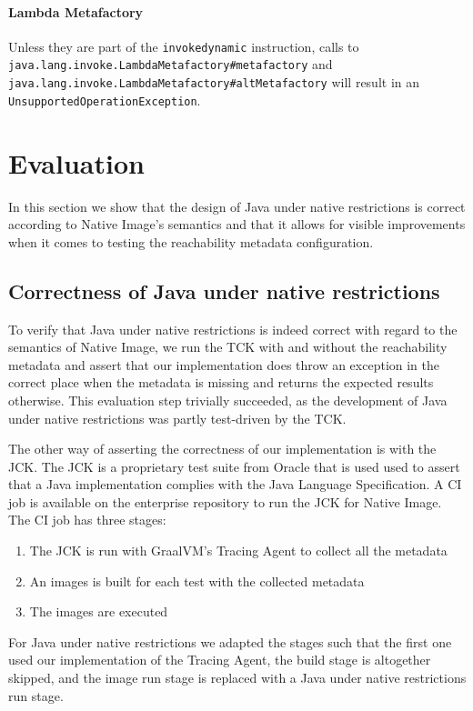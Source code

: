 \subsubsection{Lambda Metafactory}

Unless they are part of the \texttt{invokedynamic} instruction, calls to \texttt{java.lang.invoke.LambdaMetafactory\#metafactory} and \texttt{java.lang.invoke.LambdaMetafactory\#altMetafactory} will result in an \texttt{UnsupportedOperationException}.


\chapter{Evaluation}
In this section we show that the design of Java under native restrictions is correct according to Native Image's semantics and that it allows for visible improvements when it comes to testing the reachability metadata configuration.

\section{Correctness of Java under native restrictions}
To verify that Java under native restrictions is indeed correct with regard to the semantics of Native Image, we run the TCK with and without the reachability metadata and assert that our implementation does throw an exception in the correct place when the metadata is missing and returns the expected results otherwise. This evaluation step trivially succeeded, as the development of Java under native restrictions was partly test-driven by the TCK.

The other way of asserting the correctness of our implementation is with the JCK. The JCK is a proprietary test suite from Oracle that is used used to assert that a Java implementation complies with the Java Language Specification. A CI job is available on the enterprise repository to run the JCK for Native Image. The CI job has three stages:
\begin{enumerate}
    \item The JCK is run with GraalVM's Tracing Agent to collect all the metadata
    \item An images is built for each test with the collected metadata
    \item The images are executed
\end{enumerate}
For Java under native restrictions we adapted the stages such that the first one used our implementation of the Tracing Agent, the build stage is altogether skipped, and the image run stage is replaced with a Java under native restrictions run stage.

